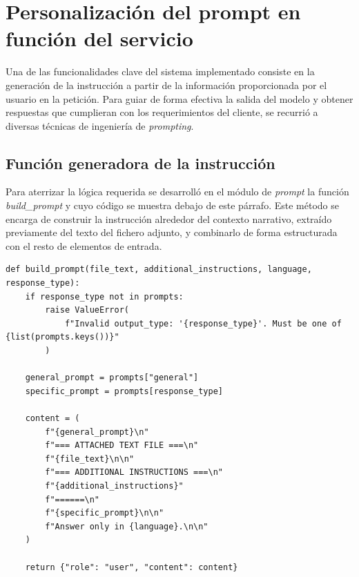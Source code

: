 \section{Personalización del prompt en función del servicio}

Una de las funcionalidades clave del sistema implementado consiste en la generación de la instrucción
a partir de la información proporcionada por el usuario en la petición.
Para guiar de forma efectiva la salida del modelo y obtener respuestas que cumplieran con los requerimientos del cliente,
se recurrió a diversas técnicas de ingeniería de \textit{prompting}.

\subsection{Función generadora de la instrucción}
\label{subsec:prompt}
Para aterrizar la lógica requerida se desarrolló en el módulo de \textit{prompt} la función \textit{build\_prompt}
y cuyo código se muestra debajo de este párrafo.
Este método se encarga de construir la instrucción alrededor del contexto narrativo,
extraído previamente del texto del fichero adjunto,
y combinarlo de forma estructurada con el resto de elementos de entrada.

\pagebreak
\begin{lstlisting}[label=cod:prompt,caption=Estructura de la función que construye la instrucción para el modelo.]
def build_prompt(file_text, additional_instructions, language, response_type):
    if response_type not in prompts:
        raise ValueError(
            f"Invalid output_type: '{response_type}'. Must be one of {list(prompts.keys())}"
        )

    general_prompt = prompts["general"]
    specific_prompt = prompts[response_type]

    content = (
        f"{general_prompt}\n"
        f"=== ATTACHED TEXT FILE ===\n"
        f"{file_text}\n\n"
        f"=== ADDITIONAL INSTRUCTIONS ===\n"
        f"{additional_instructions}"
        f"======\n"
        f"{specific_prompt}\n\n"
        f"Answer only in {language}.\n\n"
    )

    return {"role": "user", "content": content}

\end{lstlisting}

